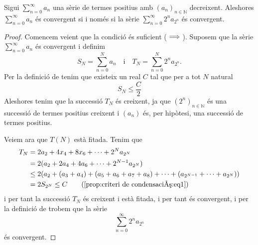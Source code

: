\documentclass[../Apunts.tex]{subfiles}
\begin{document}
	\begin{proposition}
		\label{prop:criteri de condensació}
		Sigui \(\sum_{n=0}^{\infty}a_{n}\) una sèrie de termes positius amb \((a_{n})_{n\in\mathbb{N}}\) decreixent. Aleshores \(\sum_{n=0}^{\infty}a_{n}\) és convergent si i només si la sèrie \(\sum_{n=0}^{\infty}2^{n}a_{2^{n}}\) és convergent.
		\begin{proof}
			Comencem veient que la condició és suficient (\(\implies\)). Suposem que la sèrie \(\sum_{n=0}^{\infty}a_{n}\) és convergent i definim
			\[S_{N}=\sum_{n=0}^{N}a_{n}\quad\text{i}\quad T_{N}=\sum_{n=0}^{N}2^{n}a_{2^{n}}.\]
			Per la definició de  tenim que existeix un real \(C\) tal que per a tot \(N\) natural
			\begin{equation}
				\label{prop:criteri de condensació:eq1}
				S_{N}\leq\frac{C}{2}
			\end{equation}
			Aleshores tenim que la successió \(T_{N}\) és creixent, ja que \((2^{n})_{n\in\mathbb{N}}\) és una successió de termes positius creixent i \((a_{n})\) és, per hipòtesi, una successió de termes positius. %
			
			Veiem ara que \(T(N)\) està fitada. Tenim que
			\begin{align*}
				T_{N}&=2a_{2}+4x_{4}+8x_{6}+\dots+2^{N}a_{2^{N}} \\
				&=2(a_{2}+2a_{4}+4a_{6}+\dots+2^{N-1}a_{2^{N}}) \\
				&\leq2\left(a_{2}+(a_{3}+a_{4})+(a_{5}+a_{6}+a_{7}+a_{8})+\dots+(a_{2^{N-1}}+\dots+a_{2^{N}})\right) \\
				&=2S_{2^{N}}\leq C \tag{\ref{prop:criteri de condensació:eq1}}
			\end{align*}
			i per tant la successió \(T_{N}\) és creixent i està fitada, i per tant és convergent, i per la definició de  trobem que la sèrie
			\[\sum_{n=0}^{\infty}2^{n}a_{2^{n}}\]
			és convergent.
			

\end{proof}
\end{proposition}
\end{document}
